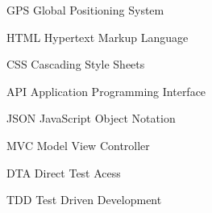 \begin{siglas}
  \item[GPS] Global Positioning System
  \item[HTML] Hypertext Markup Language
  \item[CSS] Cascading Style Sheets
  \item[API] Application Programming Interface
  \item[JSON] JavaScript Object Notation
  \item[MVC] Model View Controller
  \item[DTA] Direct Test Acess
  \item[TDD] Test Driven Development
\end{siglas}
